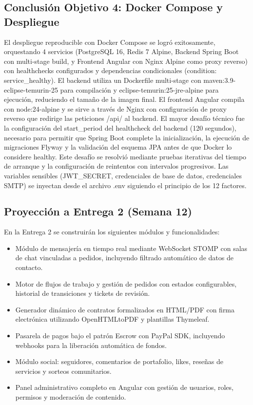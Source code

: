 \documentclass[
]{article}
\begin{document}
\subsection{Conclusión Objetivo 4: Docker Compose y
Despliegue}

El despliegue reproducible con Docker Compose se logró exitosamente,
orquestando 4 servicios (PostgreSQL 16, Redis 7 Alpine, Backend Spring
Boot con multi-stage build, y Frontend Angular con Nginx Alpine como
proxy reverso) con healthchecks configurados y dependencias
condicionales (condition: service\_healthy). El backend utiliza un
Dockerfile multi-stage con maven:3.9-eclipse-temurin-25 para compilación
y eclipse-temurin:25-jre-alpine para ejecución, reduciendo el tamaño de
la imagen final. El frontend Angular compila con node:24-alpine y se
sirve a través de Nginx con configuración de proxy reverso que redirige
las peticiones /api/ al backend. El mayor desafío técnico fue la
configuración del start\_period del healthcheck del backend (120
segundos), necesario para permitir que Spring Boot complete la
inicialización, la ejecución de migraciones Flyway y la validación del
esquema JPA antes de que Docker lo considere healthy. Este desafío se
resolvió mediante pruebas iterativas del tiempo de arranque y la
configuración de reintentos con intervalos progresivos. Las variables
sensibles (JWT\_SECRET, credenciales de base de datos, credenciales
SMTP) se inyectan desde el archivo .env siguiendo el principio de los 12
factores.

\subsection{Proyección a Entrega 2 (Semana
12)}

En la Entrega 2 se construirán los siguientes módulos y funcionalidades:

\begin{itemize}
\item
  Módulo de mensajería en tiempo real mediante WebSocket STOMP con salas
  de chat vinculadas a pedidos, incluyendo filtrado automático de datos
  de contacto.
\item
  Motor de flujos de trabajo y gestión de pedidos con estados
  configurables, historial de transiciones y tickets de revisión.
\item
  Generador dinámico de contratos formalizados en HTML/PDF con firma
  electrónica utilizando OpenHTMLtoPDF y plantillas Thymeleaf.
\item
  Pasarela de pagos bajo el patrón Escrow con PayPal SDK, incluyendo
  webhooks para la liberación automática de fondos.
\item
  Módulo social: seguidores, comentarios de portafolio, likes, reseñas
  de servicios y sorteos comunitarios.
\item
  Panel administrativo completo en Angular con gestión de usuarios,
  roles, permisos y moderación de contenido.
\end{itemize}
\end{document}
